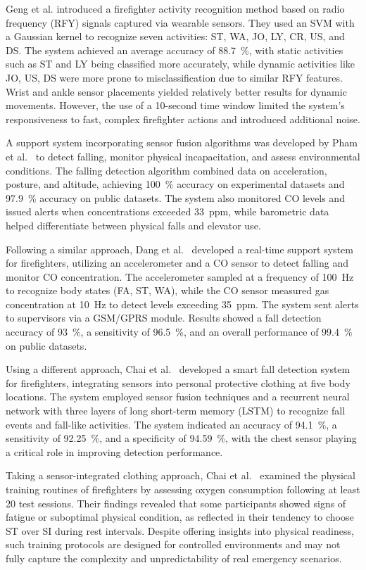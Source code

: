 \documentclass[journal,twoside,web]{ieeecolor}
\begin{document}
Geng et al. \cite{Geng2016} introduced a firefighter activity recognition method based on radio frequency (RFY) signals captured via wearable sensors. They used an SVM with a Gaussian kernel to recognize seven activities: ST, WA, JO, LY, CR, US, and DS. The system achieved an average accuracy of 88.7~\%, with static activities such as ST and LY being classified more accurately, while dynamic activities like JO, US, DS were more prone to misclassification due to similar RFY features. Wrist and ankle sensor placements yielded relatively better results for dynamic movements. However, the use of a 10-second time window limited the system’s responsiveness to fast, complex firefighter actions and introduced additional noise.

A support system incorporating sensor fusion algorithms was developed by Pham et al.~\cite{Thanhfire2019} to detect falling, monitor physical incapacitation, and assess environmental conditions. The falling detection algorithm combined data on acceleration, posture, and altitude, achieving 100~\% accuracy on experimental datasets and 97.9~\% accuracy on public datasets. The system also monitored CO levels and issued alerts when concentrations exceeded 33~ppm, while barometric data helped differentiate between physical falls and elevator use.

Following a similar approach, Dang et al.~\cite{Dang2022} developed a real-time support system for firefighters, utilizing an accelerometer and a CO sensor to detect falling and monitor CO concentration. The accelerometer sampled at a frequency of 100~Hz to recognize body states (FA, ST, WA), while the CO sensor measured gas concentration at 10~Hz to detect levels exceeding 35~ppm. The system sent alerts to supervisors via a GSM/GPRS module. Results showed a fall detection accuracy of 93~\%, a sensitivity of 96.5~\%, and an overall performance of 99.4~\% on public datasets.

Using a different approach, Chai et al.~\cite{Chai2021} developed a smart fall detection system for firefighters, integrating sensors into personal protective clothing at five body locations. The system employed sensor fusion techniques and a recurrent neural network with three layers of long short-term memory (LSTM) to recognize fall events and fall-like activities. The system indicated an accuracy of 94.1~\%, a sensitivity of 92.25~\%, and a specificity of 94.59~\%, with the chest sensor playing a critical role in improving detection performance.

Taking a sensor-integrated clothing approach, Chai et al.~\cite{CHAI_FIRE2024} examined the physical training routines of firefighters by assessing oxygen consumption following at least 20 test sessions. Their findings revealed that some participants showed signs of fatigue or suboptimal physical condition, as reflected in their tendency to choose ST over SI during rest intervals. Despite offering insights into physical readiness, such training protocols are designed for controlled environments and may not fully capture the complexity and unpredictability of real emergency scenarios.
\end{document}
